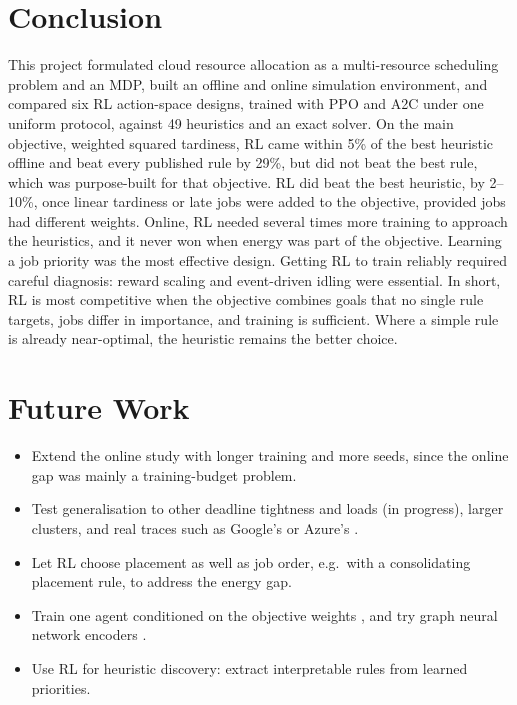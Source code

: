 \documentclass[12pt]{article}
\begin{document}
\section{Conclusion}\label{sec:conclusion}
This project formulated cloud resource allocation as a multi-resource scheduling problem and an MDP, built an offline and online simulation environment, and compared six RL action-space designs, trained with PPO and A2C under one uniform protocol, against 49 heuristics and an exact solver. On the main objective, weighted squared tardiness, RL came within 5\% of the best heuristic offline and beat every published rule by 29\%, but did not beat the best rule, which was purpose-built for that objective. RL did beat the best heuristic, by 2--10\%, once linear tardiness or late jobs were added to the objective, provided jobs had different weights. Online, RL needed several times more training to approach the heuristics, and it never won when energy was part of the objective. Learning a job priority was the most effective design. Getting RL to train reliably required careful diagnosis: reward scaling and event-driven idling were essential. In short, RL is most competitive when the objective combines goals that no single rule targets, jobs differ in importance, and training is sufficient. Where a simple rule is already near-optimal, the heuristic remains the better choice.

\section{Future Work}
\begin{itemize}
    \item Extend the online study with longer training and more seeds, since the online gap was mainly a training-budget problem.
    \item Test generalisation to other deadline tightness and loads (in progress), larger clusters, and real traces such as Google's \cite{reiss2012googletrace} or Azure's \cite{cortez2017resourcecentral}.
    \item Let RL choose placement as well as job order, e.g.\ with a consolidating placement rule, to address the energy gap.
    \item Train one agent conditioned on the objective weights \cite{abels2019dynamicweights, hayes2022morlguide}, and try graph neural network encoders \cite{gnn2024jsspsurvey}.
    \item Use RL for heuristic discovery: extract interpretable rules from learned priorities.
\end{itemize}
\end{document}
